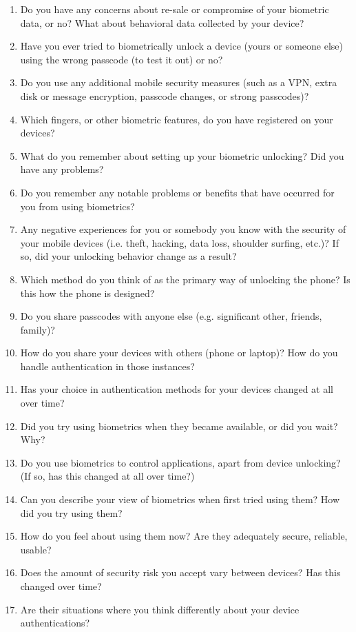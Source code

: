 \begin{enumerate}
\item Do you have any concerns about re-sale or compromise of your biometric data, or no? What about behavioral data collected by your device?
\item Have you ever tried to biometrically unlock a device (yours or someone else) using the wrong passcode (to test it out) or no?
\item Do you use any additional mobile security measures (such as a VPN, extra disk or message encryption, passcode changes, or strong passcodes)?
\item Which fingers, or other biometric features, do you have registered on your devices?
\item What do you remember about setting up your biometric unlocking? Did you have any problems?
\item Do you remember any notable problems or benefits that have occurred for you from using biometrics?
\item Any negative experiences for you or somebody you know with the security of your mobile devices (i.e. theft, hacking, data loss, shoulder surfing, etc.)? If so, did your unlocking behavior change as a result?
\item Which method do you think of as the primary way of unlocking the phone? Is this how the phone is designed? 
\item Do you share passcodes with anyone else (e.g. significant other, friends, family)?
\item How do you share your devices with others (phone or laptop)? How do you handle authentication in those instances?
\item Has your choice in authentication methods for your devices changed at all over time?
\item Did you try using biometrics when they became available, or did you wait? Why?
\item Do you use biometrics to control applications, apart from device unlocking? (If so, has this changed at all over time?)
\item Can you describe your view of biometrics when first tried using them? How did you try using them?
\item How do you feel about using them now? Are they adequately secure, reliable, usable?
\item Does the amount of security risk you accept vary between devices? Has this changed over time?
\item Are their situations where you think differently about your device authentications?

\end{enumerate}
